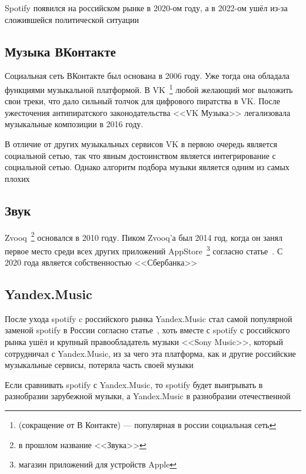 Spotify появился на российском рынке в 2020-ом году, а в 2022-ом ушёл из-за сложившейся политической ситуации

\subsection{Музыка ВКонтакте}

Социальная сеть ВКонтакте был основана в 2006 году.  Уже тогда она обладала функциями музыкальной платформой.  В VK~\footnote{(сокращение от В Контакте) --- популярная в россии социальная сеть} любой желающий мог выложить свои треки, что дало сильный толчок для цифрового пиратства в VK.  После ужесточения антипиратского законодательства <<VK Музыка>> легализовала музыкальные композиции в 2016 году.

В отличие от других музыкальных сервисов VK в первою очередь является социальной сетью, так что явным достоинством является интегрирование с социальной сетью.  Однако алгоритм подбора музыки является одним из самых плохих

\subsection{Звук}

Zvooq~\footnote{в прошлом название <<Звука>>} основался в 2010 году.  Пиком Zvooq'а был 2014 год, когда он занял первое место среди всех других приложений AppStore~\footnote{магазин приложений для устройств Apple} согласно статье~\cite{zvooq-first-in-appstore}.  С 2020 года является собственностью <<Сбербанка>>

\subsection{Yandex.Music}

После ухода spotify c российского рынка Yandex.Music стал самой популярной заменой spotify в России согласно статье~\cite{ixbt-yandex-music}, хоть вместе с spotify с российского рынка ушёл и крупный правообладатель музыки {}<<Sony Music>>{}, который сотрудничал с Yandex.Music, из за чего эта платформа, как и другие российские музыкальные сервисы, потеряла часть своей музыки

Если сравнивать spotify с Yandex.Music, то spotify будет выигрывать в разнобразии зарубежной музыки, а Yandex.Music в разнобразии отечественной

